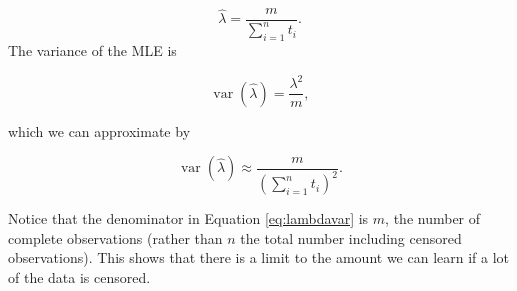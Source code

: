 \documentclass[
  openany]{book}
\theoremstyle{definition}
\theoremstyle{definition}
\theoremstyle{definition}
\theoremstyle{definition}
\theoremstyle{remark}
\begin{document}
\[\hat{\lambda} = \frac{m}{\sum\limits_{i=1}^n t_i}.\]
The variance of the MLE is

\begin{equation}
\operatorname{var}\left(\hat\lambda\right) = \frac{\lambda^2}{m},
\label{eq:lambdavar}
\end{equation}

which we can approximate by

\[\operatorname{var}\left(\hat\lambda\right) \approx \frac{m}{\left(\sum\limits_{i=1}^n t_i\right)^2}.\]

Notice that the denominator in Equation \eqref{eq:lambdavar} is \(m\), the number of complete observations (rather than \(n\) the total number including censored observations). This shows that there is a limit to the amount we can learn if a lot of the data is censored.
\end{document}
